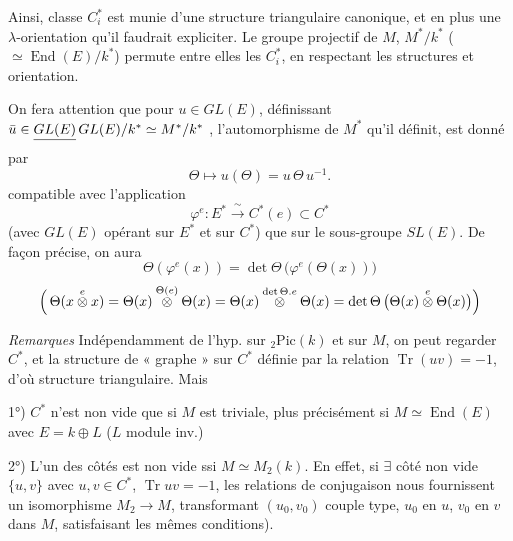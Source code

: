 \documentclass[11pt,a4paper]{article}
\begin{document}
Ainsi, \struck{\ill{}}  classe $C^*_i$   est munie \struck{\ill{}} d'une structure  triangulaire \struck{\ill{}}  canonique, et en plus une $\lambda$-orientation  qu'il faudrait expliciter. Le groupe projectif de $M$, $M^*/k^*$ ($\simeq \operatorname{End}(E)/k^*$) permute  entre elles les $C^*_i$,  en respectant les structures et orientation.

  On fera attention  que pour $u\in GL(E)$, définissant $\bar u\in \struck{GL(E)} \, GL(E)/k^*\simeq M^*/k^*$ \struck{\ill{}} , l'automorphisme de $M^*$ \struck{\ill{}} qu'il définit, est donné par
\[
  \Theta \longmapsto u(\Theta) = u\,\Theta\, u^{-1} .
\]
 compatible avec l'application
\[
  \varphi^e : E^* \xrightarrow{\ \sim\ } C^*(e) \subset C^*
\]
(avec $GL(E)$ opérant sur $E^*$ et sur $C^*$) que sur le sous-groupe $SL(E)$. De façon précise, on aura
\[
  \boxed{\ \Theta(\varphi^e(x)) = \det\Theta\,\bigl(\varphi^e(\Theta(x))\bigr)\ }
\]
\[
  \Bigl(\, \Theta(x\overset{e}{\otimes} x) = \Theta(x)\overset{\Theta(e)}{\otimes}\Theta(x)
  = \Theta(x)\overset{\det\Theta.e}{\otimes}\Theta(x)
  = \det\Theta\,\bigl(\Theta(x)\overset{e}{\otimes}\Theta(x)\bigr) \Bigr)
\]



\emph{Remarques} Indépendamment de l'hyp. sur ${}_2\mathrm{Pic}(k)$ et sur $M$, on peut regarder $C^*$, et la structure de « graphe » sur $C^*$ définie par la relation $\operatorname{Tr}(uv) = -1$, d'où structure triangulaire. Mais

1°) $C^*$  n'est non vide que si $M$ est triviale, plus précisément si $M\simeq\operatorname{End}(E)$ avec $E = k\oplus L$ ($L$ module inv.)

2°)  L'un des côtés est non vide ssi $M \simeq M_2(k)$. En effet, si $\exists$ côté non vide $\{u,v\}$  avec $u,v\in C^*$, $\operatorname{Tr} uv = -1$, les relations de conjugaison nous fournissent un isomorphisme $M_2 \to M$, transformant $(u_0,v_0)$ couple type, $u_0$ en $u$, $v_0$ en $v$ dans $M$, satisfaisant les mêmes conditions).
\end{document}
